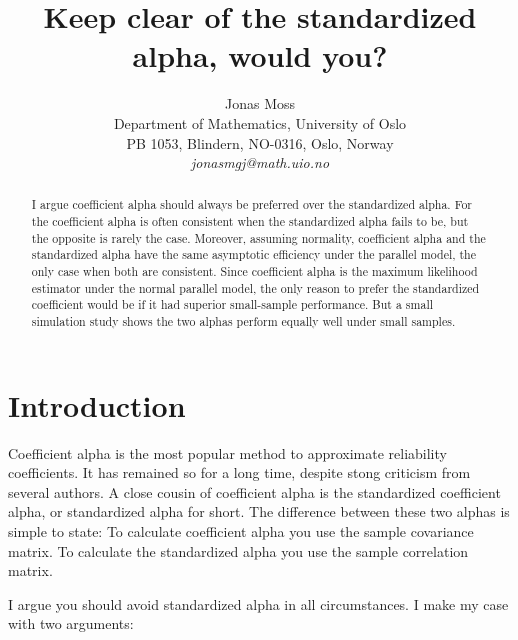 \documentclass{article}
\title{Keep clear of the standardized alpha, would you?}
\author{
  Jonas Moss \\
  Department of Mathematics, University of Oslo\\
  PB 1053, Blindern, NO-0316, Oslo, Norway \\
  \it{jonasmgj@math.uio.no}
}
\theoremstyle{plain}
\theoremstyle{plain}
\theoremstyle{definition}
\theoremstyle{remark}
\theoremstyle{definition}
\theoremstyle{plain}
\theoremstyle{plain}
\theoremstyle{definition}
\begin{document}
\maketitle

\begin{abstract}
I argue coefficient alpha should always be preferred over the standardized alpha. For the coefficient alpha is often consistent when the standardized alpha fails to be, but the opposite is rarely the case. Moreover, assuming normality, coefficient alpha and the standardized alpha have the same asymptotic efficiency under the parallel model, the only case when both are consistent. Since coefficient alpha is the maximum likelihood estimator under the normal parallel model, the only reason to prefer the standardized coefficient would be if it had superior small-sample performance. But a small simulation study shows the two alphas perform equally well under small samples.
\end{abstract}


\section{Introduction}
Coefficient alpha is the most popular method to approximate reliability coefficients. It has remained so for a long time, despite stong criticism from several authors. A close cousin of coefficient alpha is the standardized coefficient alpha, or standardized alpha for short. The difference between these two alphas is simple to state: To calculate coefficient alpha you use the sample covariance matrix. To calculate the standardized alpha you use the sample correlation matrix.

I argue you should avoid standardized alpha in all circumstances. I make my case with two arguments:
\end{document}
